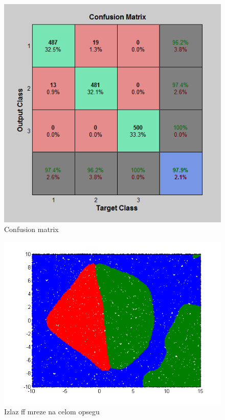 \documentclass{report}
\begin{document}
\begin{enumerate}
\begin{enumerate}
\begin{figure}[!h]
\begin{center}
\includegraphics[scale=0.7]{B1confussionFF2early.png}
\caption{Confusion matrix}
\end{center}
\end{figure}

\begin{figure}[!h]
\begin{center}
\includegraphics[scale=0.8]{B1outputFF2earlyRandom50000.png}
\caption{Izlaz ff mreze na celom opsegu}
\end{center}
\end{figure}


\end{enumerate}
\end{enumerate}
\end{document}
